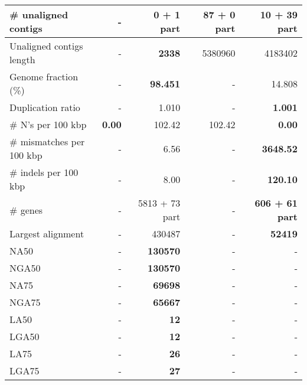 \documentclass[12pt,a4paper]{article}
\begin{document}
\begin{table}[ht]
\begin{center}
\begin{tabular}{|l*{4}{|r}|}
\# unaligned contigs & - & {\bf 0 + 1 part} & 87 + 0 part & 10 + 39 part \\ \hline
Unaligned contigs length & - & {\bf 2338} & 5380960 & 4183402 \\ \hline
Genome fraction (\%) & - & {\bf 98.451} & - & 14.808 \\ \hline
Duplication ratio & - & 1.010 & - & {\bf 1.001} \\ \hline
\# N's per 100 kbp & {\bf 0.00} & 102.42 & 102.42 & {\bf 0.00} \\ \hline
\# mismatches per 100 kbp & - & 6.56 & - & {\bf 3648.52} \\ \hline
\# indels per 100 kbp & - & 8.00 & - & {\bf 120.10} \\ \hline
\# genes & - & 5813 + 73 part & - & {\bf 606 + 61 part} \\ \hline
Largest alignment & - & 430487 & - & {\bf 52419} \\ \hline
NA50 & - & {\bf 130570} & - & - \\ \hline
NGA50 & - & {\bf 130570} & - & - \\ \hline
NA75 & - & {\bf 69698} & - & - \\ \hline
NGA75 & - & {\bf 65667} & - & - \\ \hline
LA50 & - & {\bf 12} & - & - \\ \hline
LGA50 & - & {\bf 12} & - & - \\ \hline
LA75 & - & {\bf 26} & - & - \\ \hline
LGA75 & - & {\bf 27} & - & - \\ \hline
\end{tabular}
\end{center}
\end{table}
\end{document}
